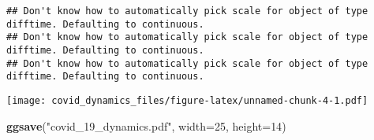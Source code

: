 \documentclass[
]{article}
\newenvironment{Shaded}{\begin{snugshade}}{\end{snugshade}}
\newcommand{\DataTypeTok}[1]{\textcolor[rgb]{0.13,0.29,0.53}{#1}}
\newcommand{\DecValTok}[1]{\textcolor[rgb]{0.00,0.00,0.81}{#1}}
\newcommand{\KeywordTok}[1]{\textcolor[rgb]{0.13,0.29,0.53}{\textbf{#1}}}
\newcommand{\NormalTok}[1]{#1}
\newcommand{\StringTok}[1]{\textcolor[rgb]{0.31,0.60,0.02}{#1}}
\begin{document}
\begin{verbatim}
## Don't know how to automatically pick scale for object of type difftime. Defaulting to continuous.
## Don't know how to automatically pick scale for object of type difftime. Defaulting to continuous.
## Don't know how to automatically pick scale for object of type difftime. Defaulting to continuous.
\end{verbatim}

\texttt{[image: covid\_dynamics\_files/figure-latex/unnamed-chunk-4-1.pdf]}

\begin{Shaded}
\begin{Highlighting}[]
\KeywordTok{ggsave}\NormalTok{(}\StringTok{"covid_19_dynamics.pdf"}\NormalTok{, }\DataTypeTok{width=}\DecValTok{25}\NormalTok{, }\DataTypeTok{height=}\DecValTok{14}\NormalTok{)}
\end{Highlighting}
\end{Shaded}
\end{document}

